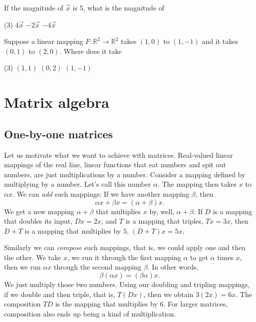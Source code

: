 \begin{exercise}
If the magnitude of $\vec{x}$ is 5, what is the magnitude of
\begin{tasks}(3)
\task
$4\vec{x}$
\task
$-2\vec{x}$
\task
$-4\vec{x}$
\end{tasks}
\end{exercise}

\begin{exercise}
Suppose a linear mapping $F \colon {\mathbb R}^2 \to {\mathbb R}^2$
takes $(1,0)$ to $(1,-1)$ and it takes $(0,1)$ to $(2,0)$. 
Where does it take
\begin{tasks}(3)
\task
$(1,1)$
\task
$(0,2)$
\task
$(1,-1)$
\end{tasks}
\end{exercise}


\sectionnewpage
\section{Matrix algebra}
\label{matalg:section}



\subsection{One-by-one matrices}

Let us motivate what we want to achieve with matrices.
Real-valued linear mappings of the real line, linear functions
that eat numbers and spit out numbers, are just multiplications by a
number.  Consider a mapping defined by multiplying by a
number.  Let's call this number $\alpha$.   The mapping then takes $x$ to
$\alpha x$.  We can
\emph{add} such mappings:
If we have another mapping $\beta$, then
\begin{equation*}
\alpha x + \beta x = (\alpha + \beta) x .
\end{equation*}
We get a new mapping $\alpha+\beta$ that multiplies $x$ by, well,
$\alpha+\beta$.  If $D$ is a mapping that doubles its input, 
$Dx = 2x$, and $T$ is a mapping that triples, $Tx = 3x$, then
$D+T$ is a mapping that multiplies by $5$, $(D+T)x = 5x$.

Similarly we can \emph{compose} such mappings, that
is, we could apply one and then the other.  We take $x$, we run it through
the first mapping $\alpha$ to get $\alpha$ times $x$, then we run
$\alpha x$ through the second mapping $\beta$.  In other words,
\begin{equation*}
\beta ( \alpha x ) = (\beta \alpha) x .
\end{equation*}
We just multiply those two numbers.  Using our doubling
and tripling mappings, if we double and then triple,
that is, $T(Dx)$, then
we obtain $3(2x) = 6x$.  The composition $TD$ is the mapping that multiplies
by $6$.  For larger matrices, composition also ends up being a kind of
multiplication.

